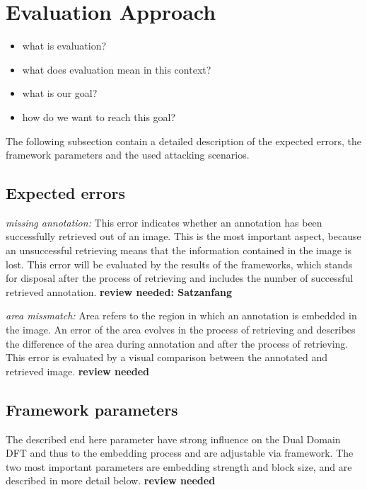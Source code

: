\section{Evaluation Approach}


\begin{itemize}
	\item what is evaluation?
	\item what does evaluation mean in this context?
	\item what is our goal?
	\item how do we want to reach this goal?
\end{itemize}



The following subsection contain a detailed description of the expected errors, the framework parameters and the used attacking scenarios.
 
\subsection{Expected errors}

\textit{missing annotation:}
This error indicates whether an annotation has been successfully retrieved out of an image.
This is the most important aspect, because an unsuccessful retrieving means that the information contained in the image is lost. 
This error will be evaluated by the results of the frameworks, which stands for disposal after the process of retrieving and includes the number of successful retrieved annotation.
\textbf{review needed: Satzanfang}

\textit{area missmatch:}
Area refers to the region in which an annotation is embedded in the image. An error of the area evolves in the process of retrieving and describes the difference of the area during annotation and after the process of retrieving. This error is evaluated by a visual comparison between the annotated and retrieved image.
\textbf{review needed}

\subsection{Framework parameters}

The described end here parameter have strong influence on the Dual Domain DFT and thus to the embedding process and are adjustable via framework. The two most important parameters are embedding strength and block size, and are described in more detail below.
\textbf{review needed}

